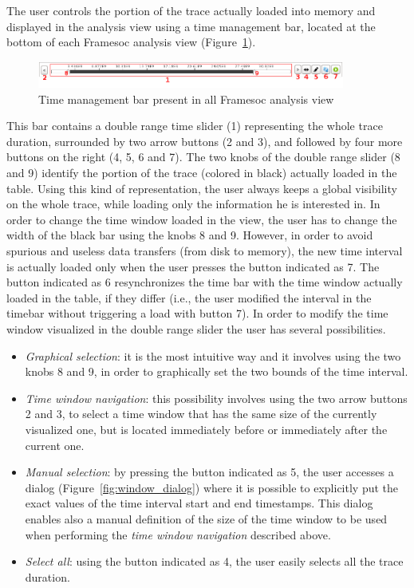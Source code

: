 \documentclass[twoside]{article}
\begin{document}
\begin{sloppypar}
The user controls the portion of the trace actually loaded into memory and displayed in the analysis view using a time management bar, located at the bottom of each Framesoc analysis view (Figure~\ref{fig:timebar}).

\begin{figure}[h!]
  \centering
    \includegraphics[width=0.9\textwidth]{images/time_bar.png}
  \caption{Time management bar present in all Framesoc analysis view}
  \label{fig:timebar}
\end{figure}

This bar contains a double range time slider (\num{1}) representing the whole trace duration, surrounded by two arrow buttons (\num{2} and \num{3}), and followed by four more buttons on the right (\num{4}, \num{5}, \num{6} and \num{7}).
The two knobs of the double range slider (\num{8} and \num{9}) identify the portion of the trace (colored in black) actually loaded in the table.
Using this kind of representation, the user always keeps a global visibility on the whole trace, while loading only the information he is interested in.
In order to change the time window loaded in the view, the user has to change the width of the black bar using the knobs \num{8} and \num{9}.
However, in order to avoid spurious and useless data transfers (from disk to memory), the new time interval is actually loaded only when the user presses the button indicated as \num{7}.
The button indicated as \num{6} resynchronizes the time bar with the time window actually loaded in the table, if they differ (i.e., the user modified the interval in the timebar without triggering a load with button \num{7}).
In order to modify the time window visualized in the double range slider the user has several possibilities. 
\begin{itemize}
 \item \emph{Graphical selection}: it is the most intuitive way and it involves using the two knobs \num{8} and \num{9}, in order to graphically set the two bounds of the time interval.
 \item \emph{Time window navigation}: this possibility involves using the two arrow buttons \num{2} and \num{3}, to select a time window that has the same size of the currently visualized one, but is located immediately before or immediately after the current one.
 \item \emph{Manual selection}: by pressing the button indicated as \num{5}, the user accesses a dialog (Figure~\ref{fig:window_dialog}) where it is possible to explicitly put the exact values of the time interval start and end timestamps. 
 This dialog enables also a manual definition of the size of the time window to be used when performing the \emph{time window navigation} described above.
 \item \emph{Select all}: using the button indicated as \num{4}, the user easily selects all the trace duration.
\end{itemize}


\end{sloppypar}
\end{document}
